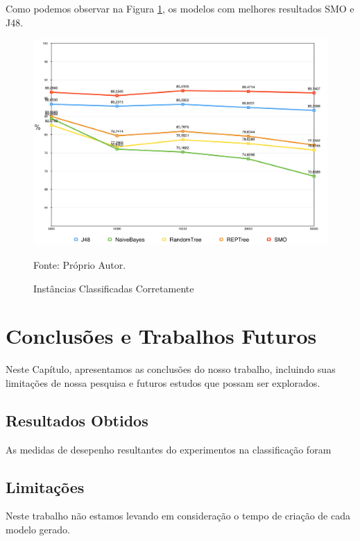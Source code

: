 \documentclass[
	12pt,				%
	openright,			%
	oneside,	
	a4paper,				%
	english,				%
	brazil				%
]{abntex2/abntex2} %
\begin{document}
	Como podemos observar na Figura \ref{figinstanciasClassificadasCorretamente}, os modelos com melhores resultados SMO e J48.
	\\
	\begin{figure}[!htb]
		\caption{\label{figinstanciasClassificadasCorretamente} Instâncias Classificadas Corretamente}
		\begin{center}
			\includegraphics[scale=0.60]{img/instanciasClassificadasCorretamente.png}
		\end{center}
		 Fonte: Próprio Autor.
	\end{figure}
	
\chapter{Conclusões e Trabalhos Futuros}

	Neste Capítulo, apresentamos as conclusões do nosso trabalho, incluindo suas limitações de nossa pesquisa e futuros estudos que possam ser explorados.

	\section{Resultados Obtidos}

	As medidas de desepenho resultantes do experimentos na classificação foram 
	
	\section{Limitações}
	
	Neste trabalho não estamos levando em consideração o tempo de criação de cada modelo gerado.
	
\end{document}
